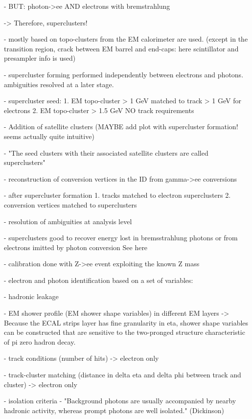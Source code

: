 - BUT: photon->ee AND electrons with bremstrahlung

-> Therefore, superclusters!

- mostly based on topo-clusters from the EM calorimeter are used. (except in the transition region, crack between EM barrel and end-caps: here scintillator and presampler info is used)

- supercluster forming performed independently between electrons and photons. ambiguities resolved at a later stage.

- supercluster seed:
    1. EM topo-cluster > 1 GeV matched to track > 1 GeV for electrons
    2. EM topo-cluster > 1.5 GeV NO track requirements

- Addition of satellite clusters (MAYBE add plot with supercluster formation! seems actually quite intuitive)

- "The seed clusters with their associated satellite clusters are called superclusters"

- reconstruction of conversion vertices in the ID from gamma->ee conversions

- after supercluster formation 
    1. tracks matched to electron superclusters
    2. conversion vertices matched to superclusters

- resolution of ambiguities at analysis level

- superclusters good to recover energy lost in bremsstrahlung photons or from electrons imitted by photon conversion
See here 

- calibration done with Z->ee event exploiting the known Z mass

- electron and photon identification based on a set of variables:

    - hadronic leakage

    - EM shower profile (EM shower shape variables) in different EM layers
        -> Because the ECAL strips layer has fine granularity in eta, shower shape variables can be constructed that are sensitive to the two-pronged structure characteristic of pi zero hadron decay.

    - track conditions (number of hits) -> electron only

    - track-cluster matching (distance in delta eta and delta phi between track and cluster) -> electron only 

- isolation criteria
   - "Background photons are usually accompanied by nearby hadronic activity, whereas prompt photons are well isolated." (Dickinson)




